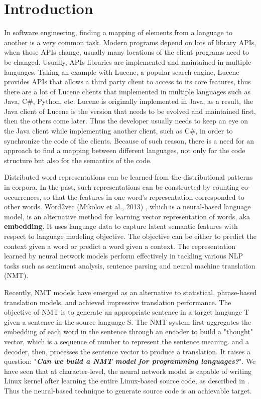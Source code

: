 \section{Introduction}

In software engineering, finding a mapping of elements from a language to another is a very common task. Modern programs depend on lots of library APIs, when those APIs change, usually many locations of the client programs need to be changed. Usually, APIs libraries are implemented and maintained in multiple languages. Taking an example with Lucene, a popular search engine, Lucene provides APIs that allows a third party client to access to its core features, thus there are a lot of Lucene clients that implemented in multiple languages such as Java, C\#, Python, etc. Lucene is originally implemented in Java, as a result, the Java client of Lucene is the version that needs to be evolved and maintained first, then the others come later. Thus the developer usually needs to keep an eye on the Java client while implementing another client, such as C\#, in order to synchronize the code of the clients. Because of such reason, there is a need for an approach to find a mapping between different languages, not only for the code structure but also for the semantics of the code.

Distributed word representations can be learned from the distributional patterns in corpora. In the past, such representations can be constructed by counting co-occurrences, so that the features in one word's representation corresponded to other words. Word2vec (Mikolov et al., 2013) \cite{mikolov2013distributed}, which is a neural-based language model, is an alternative method for learning vector representation of words, aka \textbf{embedding}. It uses language data to capture latent semantic features with respect to language modeling objective. The objective can be either to predict the context given a word or predict a word given a context. The representation learned by neural network models perform effectively in tackling various NLP tasks such as sentiment analysis, sentence parsing and neural machine translation (NMT).

Recently, NMT models have emerged as an alternative to statistical, phrase-based translation models, and achieved impressive translation performance. The objective of NMT is to generate an appropriate sentence in a target language T given a sentence in the source language S. The NMT system first aggregates the embedding of each word in the sentence through an encoder to build a "thought" vector, which is a sequence of number to represent the sentence meaning. and a decoder, then, processes the sentence vector to produce a translation. It raises a question: "\textbf{\textit{Can we build a NMT model for programming languages?}}". We have seen that at character-level, the neural network model is capable of writing Linux kernel after learning the entire Linux-based source code, as described in \cite{Karpathy}. Thus the neural-based technique to generate source code is an achievable target.

